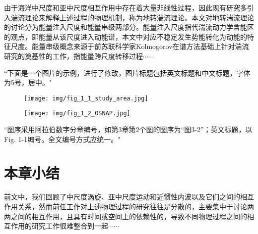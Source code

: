 由于海洋中尺度和亚中尺度相互作用中存在着大量非线性过程，因此现有研究多引入湍流理论来解释上述过程的物理机制，称为地转湍流理论。本文对地转湍流理论的讨论分为能量注入尺度和能量串级两部分。能量注入尺度指代湍流动力学含能区的观点，即能量从该尺度进入动能谱，本文中对应不稳定发生势能转化为动能的特征尺度。能量串级概念来源于前苏联科学家Kolmogorov在谱方法基础上针对湍流研究的奠基性的工作，指能量跨尺度转移过程$\cdots\cdots$

{\color{red}``下面是一个图片的示例，进行了修改，图片标题包括英文标题和中文标题，字体为5号，居中。"}

\begin{figure}[htbp]
    \centering
    \texttt{[image: img/fig\_1\_1\_study\_area.jpg]}
    \label{fig:enter-label-1}
\end{figure}

\begin{figure}[htbp]
    \centering
    \texttt{[image: img/fig\_1\_2\_OSNAP.jpg]}
    \label{fig:enter-label-2}
\end{figure}

{\color{red}``图序采用阿拉伯数字分章编号，如第3章第2个图的图序为“图3-2”；英文标题，以Fig. 1-1编号。全文编号方式应统一。"}

\section{本章小结}

前文中，我们回顾了中尺度涡旋、亚中尺度运动和近惯性内波以及它们之间的相互作用关系，然而前任工作对上述物理过程的研究往往是分散的，主要集中于讨论两两之间的相互作用，且具有时间或空间上的依赖性的，导致不同物理过程之间的相互作用的研究工作很难整合到一起$\cdots\cdots$